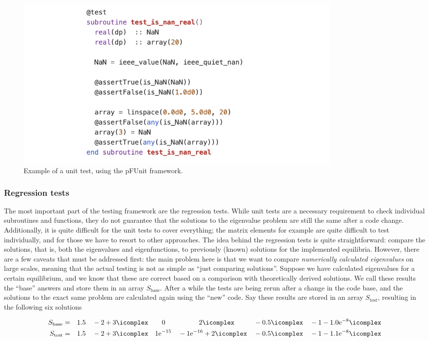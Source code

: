 \begin{figure}[t]
  \centering
  \includegraphics[width=0.80\textwidth]{unit_testing.png}
  \caption{
    Example of a {\legolas} unit test, using the pFUnit framework.
  }
  \label{fig: unit_test}
\end{figure}

\subsubsection{Regression tests}
The most important part of the testing framework are the regression tests. While unit tests are a necessary requirement to check individual subroutines and functions, they do not guarantee that the solutions to the eigenvalue problem are still the same after a code change. Additionally, it is quite difficult for the unit tests to cover everything; the matrix elements for example are quite difficult to test individually, and for those we have to resort to other approaches. The idea behind the regression tests is quite straightforward: compare the solutions, that is, both the eigenvalues and eigenfunctions, to previously (known) solutions for the implemented equilibria. However, there are a few caveats that must be addressed first: the main problem here is that we want to compare \emph{numerically calculated eigenvalues} on large scales, meaning that the actual testing is not as simple as ``just comparing solutions''. Suppose we have calculated eigenvalues for a certain equilibrium, and we know that these are correct based on a comparison with theoretically derived solutions. We call these results the ``base'' answers and store them in an array $S_\text{base}$. After a while the tests are being rerun after a change in the code base, and the solutions to the exact same problem are calculated again using the ``new'' code. Say these results are stored in an array $S_\text{test}$, resulting in the following six solutions

\begin{equation}
  \begin{aligned}
    S_\text{base} &=
      &&1.5
      &&-2 + 3\icomplex
      &&\quad 0
      &&\qquad\quad 2\icomplex
      &&-0.5\icomplex
      &&-1 - 1.0\text{e}^{-8}\icomplex \\
    S_\text{test} &=
      &&1.5
      &&-2 + 3\icomplex
      &&1\text{e}^{-15}
      &&-1\text{e}^{-16} + 2\icomplex
      &&-0.5\icomplex
      &&-1 - 1.1\text{e}^{-8}\icomplex
  \end{aligned}
\end{equation}

